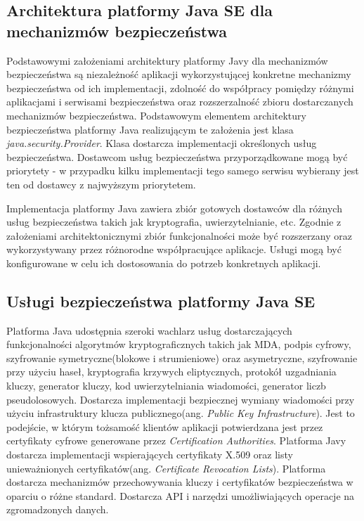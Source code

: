 	\subsection{Architektura platformy Java SE dla mechanizmów bezpieczeństwa}

		Podstawowymi założeniami architektury platformy Javy dla mechanizmów bezpieczeństwa są niezależność aplikacji wykorzystującej konkretne mechanizmy bezpieczeństwa od ich implementacji, zdolność do współpracy pomiędzy różnymi aplikacjami i serwisami bezpieczeństwa oraz rozszerzalność zbioru dostarczanych mechanizmów bezpieczeństwa. Podstawowym elementem architektury bezpieczeństwa platformy Java realizującym te założenia jest klasa \textit{java.security.Provider}. Klasa dostarcza implementacji określonych usług bezpieczeństwa. Dostawcom usług bezpieczeństwa przyporządkowane mogą być priorytety - w przypadku kilku implementacji tego samego serwisu wybierany jest ten od dostawcy z najwyższym priorytetem. 

		Implementacja platformy Java zawiera zbiór gotowych dostawców dla różnych usług bezpieczeństwa takich jak kryptografia, uwierzytelnianie, etc. Zgodnie z założeniami architektonicznymi zbiór funkcjonalności może być rozszerzany oraz wykorzystywany przez różnorodne współpracujące aplikacje. Usługi mogą być konfigurowane w celu ich dostosowania do potrzeb konkretnych aplikacji. 

	\subsection{Usługi bezpieczeństwa platformy Java SE}

		Platforma Java udostępnia szeroki wachlarz usług dostarczających funkcjonalności algorytmów kryptograficznych takich jak MDA, podpis cyfrowy, szyfrowanie symetryczne(blokowe i strumieniowe) oraz asymetryczne, szyfrowanie przy użyciu haseł, kryptografia krzywych eliptycznych, protokół uzgadniania kluczy, generator kluczy, kod uwierzytelniania wiadomości, generator liczb pseudolosowych. Dostarcza implementacji bezpiecznej wymiany wiadomości przy użyciu infrastruktury klucza publicznego(ang. \textit{Public Key Infrastructure}). Jest to podejście, w którym tożsamość klientów aplikacji potwierdzana jest przez certyfikaty cyfrowe generowane przez \textit{Certification Authorities}. Platforma Javy dostarcza implementacji wspierających certyfikaty X.509 oraz listy unieważnionych certyfikatów(ang. \textit{Certificate Revocation Lists}). Platforma dostarcza mechanizmów przechowywania kluczy i certyfikatów bezpieczeństwa w oparciu o różne standard. Dostarcza API i narzędzi umożliwiających operacje na zgromadzonych danych.

